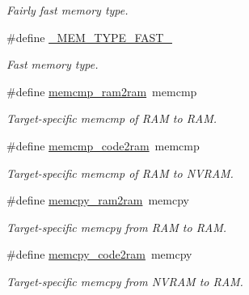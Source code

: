\begin{DoxyCompactItemize}
\begin{DoxyCompactList}\small\item\em Fairly fast memory type. \end{DoxyCompactList}\item 
\hypertarget{group__group__xmega__utils_gabf669e579471cadcf68d9ffc440e68b1}{\#define \hyperlink{group__group__xmega__utils_gabf669e579471cadcf68d9ffc440e68b1}{\-\_\-\-M\-E\-M\-\_\-\-T\-Y\-P\-E\-\_\-\-F\-A\-S\-T\-\_\-}}\label{group__group__xmega__utils_gabf669e579471cadcf68d9ffc440e68b1}

\begin{DoxyCompactList}\small\item\em Fast memory type. \end{DoxyCompactList}\item 
\hypertarget{group__group__xmega__utils_ga27819e952caa0a535a5901d2857834b7}{\#define \hyperlink{group__group__xmega__utils_ga27819e952caa0a535a5901d2857834b7}{memcmp\-\_\-ram2ram}~memcmp}\label{group__group__xmega__utils_ga27819e952caa0a535a5901d2857834b7}

\begin{DoxyCompactList}\small\item\em Target-\/specific memcmp of R\-A\-M to R\-A\-M. \end{DoxyCompactList}\item 
\hypertarget{group__group__xmega__utils_gab914bad47205a9b7afb9ac53ec71cb55}{\#define \hyperlink{group__group__xmega__utils_gab914bad47205a9b7afb9ac53ec71cb55}{memcmp\-\_\-code2ram}~memcmp}\label{group__group__xmega__utils_gab914bad47205a9b7afb9ac53ec71cb55}

\begin{DoxyCompactList}\small\item\em Target-\/specific memcmp of R\-A\-M to N\-V\-R\-A\-M. \end{DoxyCompactList}\item 
\hypertarget{group__group__xmega__utils_ga9a4ff08e7c4cf79135a3bcbab68472b7}{\#define \hyperlink{group__group__xmega__utils_ga9a4ff08e7c4cf79135a3bcbab68472b7}{memcpy\-\_\-ram2ram}~memcpy}\label{group__group__xmega__utils_ga9a4ff08e7c4cf79135a3bcbab68472b7}

\begin{DoxyCompactList}\small\item\em Target-\/specific memcpy from R\-A\-M to R\-A\-M. \end{DoxyCompactList}\item 
\hypertarget{group__group__xmega__utils_ga55724cc8f7d42eba122dac5bffa00024}{\#define \hyperlink{group__group__xmega__utils_ga55724cc8f7d42eba122dac5bffa00024}{memcpy\-\_\-code2ram}~memcpy}\label{group__group__xmega__utils_ga55724cc8f7d42eba122dac5bffa00024}

\begin{DoxyCompactList}\small\item\em Target-\/specific memcpy from N\-V\-R\-A\-M to R\-A\-M. \end{DoxyCompactList}\end{DoxyCompactItemize}


